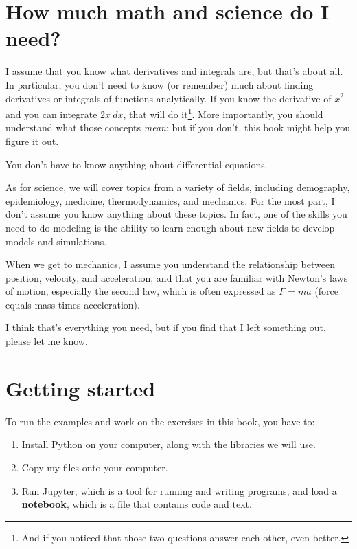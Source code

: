 \documentclass[12pt]{book}
\theoremstyle{exercise}
\begin{document}
\section*{How much math and science do I need?} 

I assume that you know what derivatives and integrals are, but that's about all.  In particular, you don't need to know (or remember) much about finding derivatives or integrals of functions analytically.  If you know the derivative of $x^2$ and you can integrate $2x~dx$, that will do it\footnote{And if you noticed that those two questions answer each other, even better.}.
More importantly, you should understand what those concepts {\em mean};  but if you don't, this book might help you figure it out.


You don't have to know anything about differential equations.

As for science, we will cover topics from a variety of fields, including demography, epidemiology, medicine, thermodynamics, and mechanics. For the most part, I don't assume you know anything about these topics.  In fact, one of the skills you need to do modeling is the ability to learn enough about new fields to develop models and simulations.

When we get to mechanics, I assume you understand the relationship between position, velocity, and acceleration, and that you are familiar with Newton's laws of motion, especially the second law, which is often expressed as $F = ma$ (force equals mass times acceleration).


I think that's everything you need, but if you find that I left something out, please let me know.


\section*{Getting started}
\label{code}

To run the examples and work on the exercises in this book, you have to:

\begin{enumerate}

\item Install Python on your computer, along with the libraries we will use.

\item Copy my files onto your computer.

\item Run Jupyter, which is a tool for running and writing programs, and load a {\bf notebook}, which is a file that contains code and text.

\end{enumerate}
\end{document}
